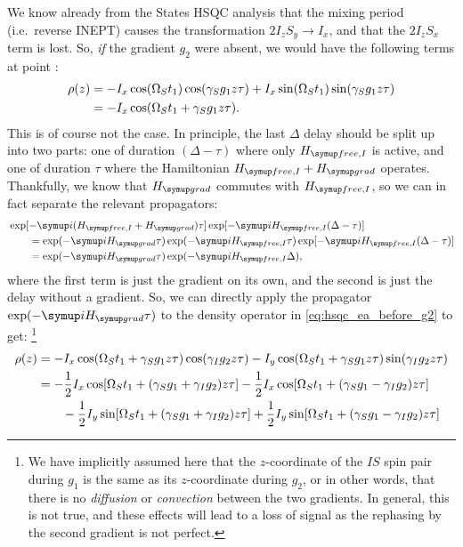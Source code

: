 We know already from the States HSQC analysis that the mixing period (i.e.\ reverse INEPT) causes the transformation $2I_zS_y \to I_x$, and that the $2I_zS_x$ term is lost.
So, \textit{if} the gradient $g_2$ were absent, we would have the following terms at point :
\begin{align}
    \label{eq:hsqc_ea_before_g2}
    \rho(z) &= -I_x\cos(\Omega_S t_1)\cos(\gamma_S g_1 z \tau) + I_x\sin(\Omega_S t_1)\sin(\gamma_S g_1 z \tau) \notag \\
            &= -I_x\cos(\Omega_S t_1 + \gamma_S g_1 z\tau).
\end{align}
This is of course not the case.
In principle, the last $\Delta$ delay should be split up into two parts: one of duration $(\Delta - \tau)$ where only $\HfreeI$ is active, and one of duration $\tau$ where the Hamiltonian $\HfreeI + \Hgrad$ operates.
Thankfully, we know that $\Hgrad$ commutes with $\HfreeI$, so we can in fact separate the relevant propagators:
\begin{align}
    \label{eq:propagators_gradient_echo}
    \MoveEqLeft \exp[-\mi(\HfreeI + \Hgrad)\tau]\exp[-\mi \HfreeI(\Delta - \tau)] \notag \\
    &= \exp(-\mi\Hgrad\tau) \exp(-\mi\HfreeI\tau)\exp[-\mi \HfreeI(\Delta - \tau)] \notag \\
    &= \exp(-\mi\Hgrad\tau) \exp(-\mi\HfreeI\Delta),
\end{align}
where the first term is just the gradient on its own, and the second is just the delay without a gradient.
So, we can directly apply the propagator $\exp(-\mi\Hgrad\tau)$ to the density operator in \cref{eq:hsqc_ea_before_g2} to get:%
\footnote{We have implicitly assumed here that the $z$-coordinate of the $IS$ spin pair during $g_1$ is the same as its $z$-coordinate during $g_2$, or in other words, that there is no \textit{diffusion} or \textit{convection} between the two gradients. In general, this is not true, and these effects will lead to a loss of signal as the rephasing by the second gradient is not perfect.}
\begin{align}
    \rho(z) &= -I_x\cos(\Omega_S t_1 + \gamma_S g_1 z \tau)\cos(\gamma_I g_2 z\tau) - I_y\cos(\Omega_S t_1 + \gamma_S g_1 z \tau)\sin(\gamma_I g_2 z\tau) \label{eq:hsqc_ea_after_g2_1} \\
            &= -\frac{1}{2}I_x \cos[\Omega_S t_1 + (\gamma_S g_1 + \gamma_I g_2)z\tau] -\frac{1}{2} I_x \cos[\Omega_S t_1 + (\gamma_S g_1 - \gamma_I g_2) z\tau]  \notag \\
            &\quad\quad - \frac{1}{2}I_y \sin[\Omega_S t_1 + (\gamma_S g_1 + \gamma_I g_2) z\tau] + \frac{1}{2}I_y \sin[\Omega_S t_1 + (\gamma_S g_1 - \gamma_I g_2) z\tau] 
            \label{eq:hsqc_ea_after_g2_2}
\end{align}
